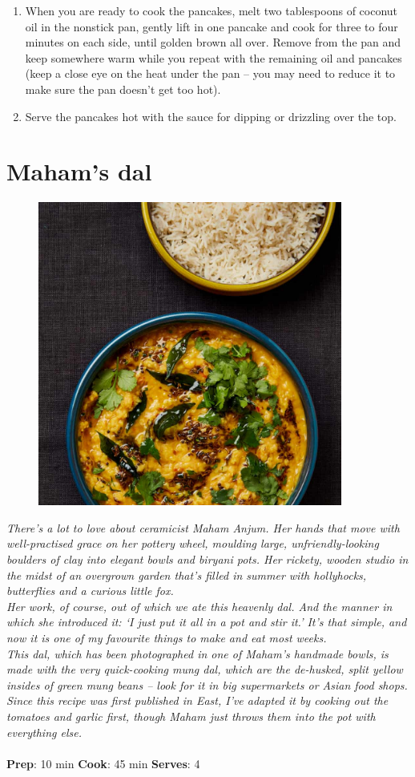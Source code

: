 \documentclass{book}
\begin{document}
\begin{enumerate}
\item When you are ready to cook the pancakes, melt two tablespoons of coconut oil in the nonstick pan, gently lift in one pancake and cook for three to four minutes on each side, until golden brown all over. Remove from the pan and keep somewhere warm while you repeat with the remaining oil and pancakes (keep a close eye on the heat under the pan – you may need to reduce it to make sure the pan doesn’t get too hot).
\item Serve the pancakes hot with the sauce for dipping or drizzling over the top.
\end{enumerate}
\newpage

\section{Maham’s dal}
\begin{figure}
\centering\includegraphics[width=10cm,height=10cm,keepaspectratio]{Recipe_Pictures/Mahams_dal.png}
\end{figure}
\emph{There’s a lot to love about ceramicist Maham Anjum. Her hands that move with well-practised grace on her pottery wheel, moulding large, unfriendly-looking boulders of clay into elegant bowls and biryani pots. Her rickety, wooden studio in the midst of an overgrown garden that’s filled in summer with hollyhocks, butterflies and a curious little fox. \\ 
Her work, of course, out of which we ate this heavenly dal. And the manner in which she introduced it: ‘I just put it all in a pot and stir it.’ It’s that simple, and now it is one of my favourite things to make and eat most weeks.\\ 
This dal, which has been photographed in one of Maham’s handmade bowls, is made with the very quick-cooking mung dal, which are the de-husked, split yellow insides of green mung beans – look for it in big supermarkets or Asian food shops. Since this recipe was first published in East, I’ve adapted it by cooking out the tomatoes and garlic first, though Maham just throws them into the pot with everything else.}\\\\ 
\textbf{Prep}: 10 min
\textbf{Cook}: 45 min
\textbf{Serves}: 4
\end{document}

